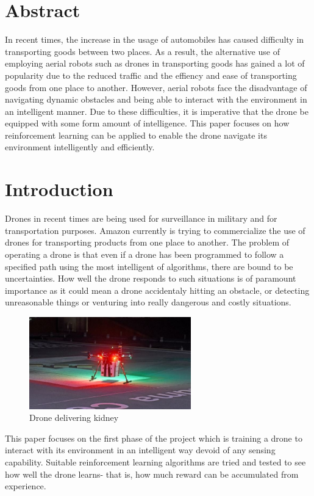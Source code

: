 \documentclass[10pt]{article}
\begin{document}
\section{Abstract}
In recent times, the increase in the usage of automobiles has caused difficulty in transporting goods between two places.
As a result, the alternative use of employing aerial robots such as drones in transporting goods has gained a lot of popularity
due to the reduced traffic and the effiency and ease of transporting goods from one place to another. 
However, aerial robots face the disadvantage of navigating dynamic obstacles  and being able to interact with the environment in an intelligent 
manner. Due to these difficulties, it is imperative that the drone be equipped with some form amount of intelligence. This paper focuses on how
reinforcement learning can be applied to enable the drone navigate its environment intelligently and efficiently.

\section{Introduction}
Drones in recent times are being used for surveillance in military and for transportation purposes. Amazon currently is trying to commercialize
the use of drones for transporting products from one place to another. The problem of operating a drone is that even if a drone has been 
programmed to follow a specified path using the most intelligent of algorithms, there are bound to be uncertainties. How well the drone responds 
to such situations is of paramount importance as it could mean a drone accidentaly hitting an obstacle, or detecting unreasonable things or
venturing into really dangerous and costly situations.

\begin{figure}[h]
    \centering
    \includegraphics[width=7cm]{kidney}
    \caption{Drone delivering kidney}
    \label{fig:Drone delivering kidney}
\end{figure}
This paper focuses on the first phase of the project which is training a drone to interact with its environment in an intelligent way devoid of 
any sensing capability. Suitable reinforcement learning algorithms are tried and tested to see how well the drone learns- that is, how much reward
can be accumulated from experience. 
\end{document}
